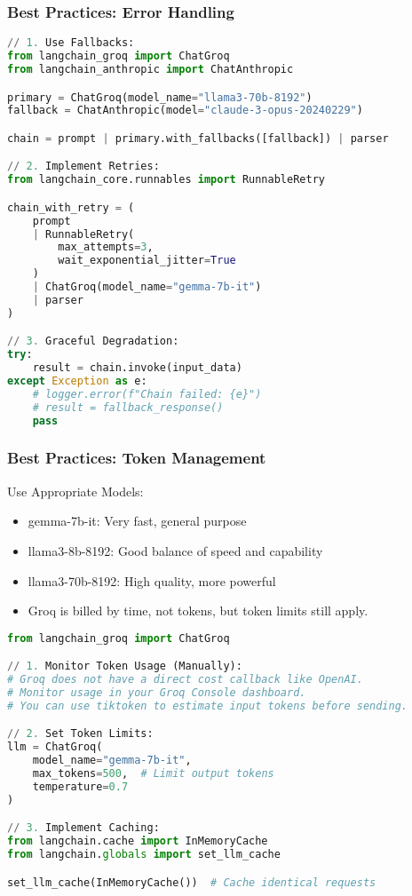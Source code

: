 \begin{frame}[fragile]\frametitle{Best Practices: Error Handling}

\begin{lstlisting}[language=python, basicstyle=\tiny]
// 1. Use Fallbacks:
from langchain_groq import ChatGroq
from langchain_anthropic import ChatAnthropic

primary = ChatGroq(model_name="llama3-70b-8192")
fallback = ChatAnthropic(model="claude-3-opus-20240229")

chain = prompt | primary.with_fallbacks([fallback]) | parser

// 2. Implement Retries:
from langchain_core.runnables import RunnableRetry

chain_with_retry = (
    prompt
    | RunnableRetry(
        max_attempts=3,
        wait_exponential_jitter=True
    )
    | ChatGroq(model_name="gemma-7b-it")
    | parser
)

// 3. Graceful Degradation:
try:
    result = chain.invoke(input_data)
except Exception as e:
    # logger.error(f"Chain failed: {e}")
    # result = fallback_response()
    pass
\end{lstlisting}

\end{frame}

\begin{frame}[fragile]\frametitle{Best Practices: Token Management}
Use Appropriate Models:
\begin{itemize}
\item gemma-7b-it: Very fast, general purpose
\item llama3-8b-8192: Good balance of speed and capability
\item llama3-70b-8192: High quality, more powerful
\item Groq is billed by time, not tokens, but token limits still apply.
\end{itemize}

\begin{lstlisting}[language=python, basicstyle=\tiny]
from langchain_groq import ChatGroq

// 1. Monitor Token Usage (Manually):
# Groq does not have a direct cost callback like OpenAI.
# Monitor usage in your Groq Console dashboard.
# You can use tiktoken to estimate input tokens before sending.

// 2. Set Token Limits:
llm = ChatGroq(
    model_name="gemma-7b-it",
    max_tokens=500,  # Limit output tokens
    temperature=0.7
)

// 3. Implement Caching:
from langchain.cache import InMemoryCache
from langchain.globals import set_llm_cache

set_llm_cache(InMemoryCache())  # Cache identical requests
\end{lstlisting}

\end{frame}

